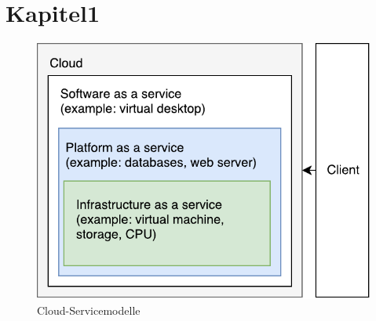\section{Kapitel1}

\begin{figure}[h!]
	\centering
	\includegraphics[width=0.8\linewidth]{images/servicemodules.pdf}
	\caption{Cloud-Servicemodelle} %
	\label{fig:cnn_structure}
\end{figure}